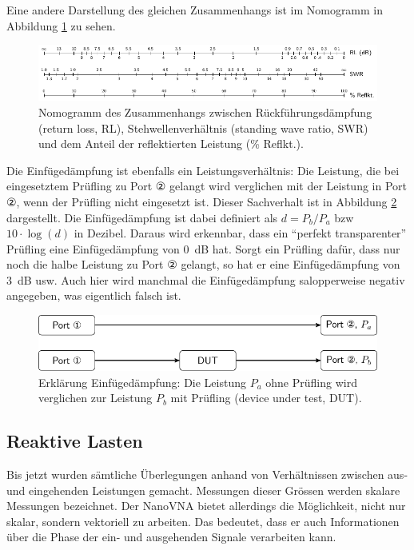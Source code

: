 \documentclass[twoside,a4paper,11pt,halfparskip,DIV=11,notitlepage]{scrartcl}
\begin{document}
Eine andere Darstellung des gleichen Zusammenhangs ist im Nomogramm in Abbildung
\ref{fig:rlnomogramm} zu sehen.

\begin{figure}[t]
    \begin{center}
        \includegraphics{figures/rl_swr_nomogram/rl_swr_nomogram.pdf}
    \end{center}
    \caption{Nomogramm des Zusammenhangs zwischen Rückführungsdämpfung (return loss, RL),
    Stehwellenverhältnis (standing wave ratio, SWR) und dem Anteil der reflektierten Leistung (\% Reflkt.).}
    \label{fig:rlnomogramm}
\end{figure}


Die Einfügedämpfung ist ebenfalls ein Leistungsverhältnis: Die Leistung, die
bei eingesetztem Prüfling zu Port ② gelangt wird verglichen mit der Leistung
in Port ②, wenn der Prüfling nicht eingesetzt ist. Dieser Sachverhalt ist in
Abbildung \ref{fig:insertionloss} dargestellt. Die Einfügedämpfung ist dabei
definiert als $d=P_b/P_a$ bzw $10\cdot\log{(d)}$ in Dezibel. Daraus wird erkennbar,
dass ein ``perfekt transparenter'' Prüfling eine Einfügedämpfung von 0~dB
hat. Sorgt ein Prüfling dafür, dass nur noch die halbe Leistung zu Port ②
gelangt, so hat er eine Einfügedämpfung von 3~dB usw. Auch hier wird manchmal
die Einfügedämpfung salopperweise negativ angegeben, was eigentlich falsch ist.

\begin{figure}[H]
    \begin{center}
        \includegraphics{figures/dut_insertionloss/dut_insertionloss.pdf}
    \end{center}
    \caption{Erklärung Einfügedämpfung: Die Leistung $P_a$ ohne Prüfling wird
    verglichen zur Leistung $P_b$ mit Prüfling (device under test, DUT).}
    \label{fig:insertionloss}
\end{figure}

\subsection{Reaktive Lasten}\label{sec:vectors}
Bis jetzt wurden sämtliche Überlegungen anhand von Verhältnissen zwischen
aus- und eingehenden Leistungen gemacht. Messungen dieser Grössen werden
skalare Messungen bezeichnet. Der NanoVNA bietet allerdings die Möglichkeit,
nicht nur skalar, sondern vektoriell zu arbeiten. Das bedeutet, dass er auch
Informationen über die Phase der ein- und ausgehenden Signale verarbeiten kann.
\end{document}
